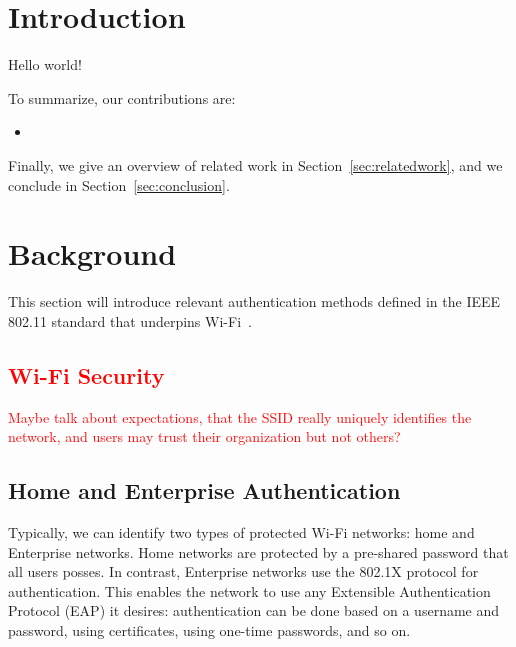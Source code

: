 \documentclass[sigconf,review]{acmart}
\newcommand{\wifi}{\mbox{Wi-Fi}}
\DeclareRobustCommand{\red}[1]{\textcolor{red}{#1}}
\begin{document}
\maketitle

\section{Introduction}

Hello world!

To summarize, our contributions are:
\begin{itemize}
    \item 
\end{itemize}
Finally, we give an overview of related work in Section~\ref{sec:relatedwork}, and we conclude in Section~\ref{sec:conclusion}.


\section{Background}

This section will introduce relevant authentication methods defined in the IEEE 802.11 standard that underpins \wifi{}~\cite{ieee80211-2020}.

\subsection{\red{\wifi{} Security}}

\red{Maybe talk about expectations, that the SSID really uniquely identifies the network, and users may trust their organization but not others?}

\subsection{Home and Enterprise Authentication}

Typically, we can identify two types of protected \wifi{} networks: home and Enterprise networks.
Home networks are protected by a pre-shared password that all users posses.
In contrast, Enterprise networks use the 802.1X protocol for authentication.
This enables the network to use any Extensible Authentication Protocol (EAP) it desires: authentication can be done based on a username and password, using certificates, using one-time passwords, and so on.
\end{document}
